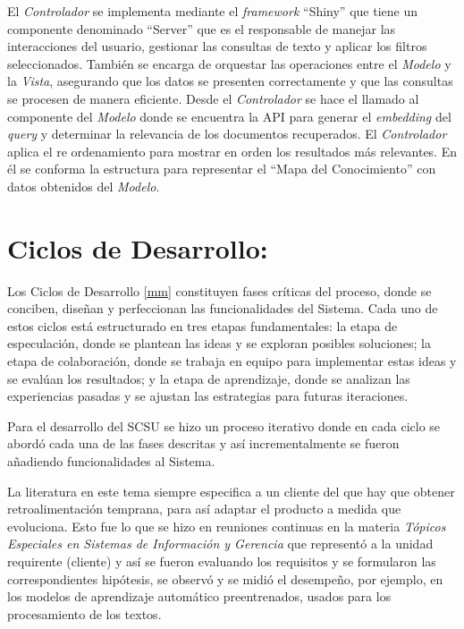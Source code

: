 \documentclass[
  12pt,
  openany]{book}
\begin{document}
El \emph{Controlador} se implementa mediante el \emph{framework} ``Shiny'' que tiene un componente denominado ``Server'' que es el responsable de manejar las interacciones del usuario, gestionar las consultas de texto y aplicar los filtros seleccionados. También se encarga de orquestar las operaciones entre el \emph{Modelo} y la \emph{Vista}, asegurando que los datos se presenten correctamente y que las consultas se procesen de manera eficiente. Desde el \emph{Controlador} se hace el llamado al componente del \emph{Modelo} donde se encuentra la API para generar el \emph{embedding} del \emph{query} y determinar la relevancia de los documentos recuperados. El \emph{Controlador} aplica el re ordenamiento para mostrar en orden los resultados más relevantes. En él se conforma la estructura para representar el ``Mapa del Conocimiento'' con datos obtenidos del \emph{Modelo}.

\hypertarget{desarrollociclos}{%
\section{Ciclos de Desarrollo:}\label{desarrollociclos}}

Los Ciclos de Desarrollo \ref{mm} constituyen fases críticas del proceso, donde se conciben, diseñan y perfeccionan las funcionalidades del Sistema. Cada uno de estos ciclos está estructurado en tres etapas fundamentales: la etapa de especulación, donde se plantean las ideas y se exploran posibles soluciones; la etapa de colaboración, donde se trabaja en equipo para implementar estas ideas y se evalúan los resultados; y la etapa de aprendizaje, donde se analizan las experiencias pasadas y se ajustan las estrategias para futuras iteraciones.

Para el desarrollo del SCSU se hizo un proceso iterativo donde en cada ciclo se abordó cada una de las fases descritas y así incrementalmente se fueron añadiendo funcionalidades al Sistema.

La literatura en este tema siempre especifica a un cliente del que hay que obtener retroalimentación temprana, para así adaptar el producto a medida que evoluciona. Esto fue lo que se hizo en reuniones continuas en la materia \emph{Tópicos Especiales en Sistemas de Información y Gerencia} que representó a la unidad requirente (cliente) y así se fueron evaluando los requisitos y se formularon las correspondientes hipótesis, se observó y se midió el desempeño, por ejemplo, en los modelos de aprendizaje automático preentrenados, usados para los procesamiento de los textos.
\end{document}
